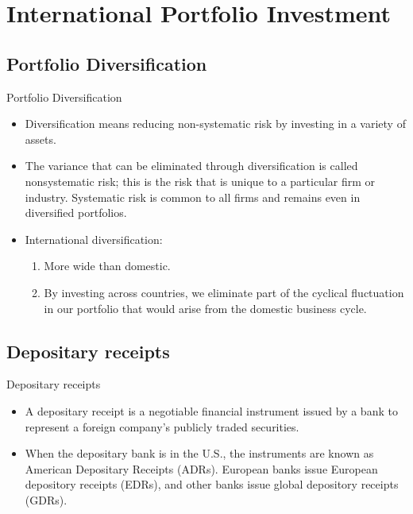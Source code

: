 \documentclass[international_finance_p2.tex]{subfiles}
\begin{document}
\section{International Portfolio Investment}

\subsection{Portfolio Diversification}
\begin{frame}{Portfolio Diversification}
\begin{itemize}[<+->]
\item
Diversification means reducing non-systematic risk by investing in a variety of assets.
\item
The variance that can be eliminated through diversification is called nonsystematic risk; this is the risk that is unique to a particular firm or industry. Systematic risk is common to all firms and remains even in diversified portfolios.
\item
International diversification:
\begin{enumerate}
\item
More wide than domestic.
\item
By investing across countries, we eliminate part of the cyclical fluctuation in our portfolio that would arise from the domestic business cycle.
\end{enumerate}
\end{itemize}
\end{frame}

\subsection{Depositary receipts}
\begin{frame}{Depositary receipts}
\begin{itemize}[<+->]
\item
A depositary receipt is a negotiable financial instrument issued by a bank to represent a foreign company's publicly traded securities.
\item
When the depositary bank is in the U.S., the instruments are known as American Depositary Receipts (ADRs). European banks issue European depository receipts (EDRs), and other banks issue global depository receipts (GDRs).
\end{itemize}
\end{frame}
\end{document}
